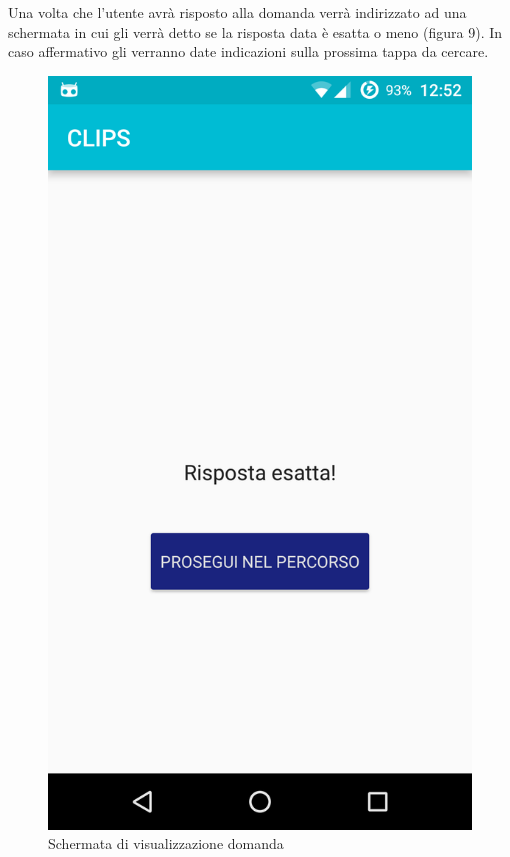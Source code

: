 Una volta che l'utente avrà risposto alla domanda verrà indirizzato ad una schermata in cui gli verrà detto se la risposta data è esatta o meno (figura 9). In caso affermativo gli verranno date indicazioni sulla prossima tappa da cercare.

\begin{figure}[!h]
	\centering
	\includegraphics[scale=0.15]{screenshot/risultato_prova}
	\caption{Schermata di visualizzazione domanda}
\end{figure}

